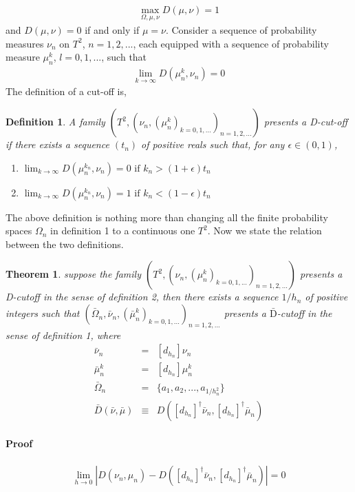 \documentclass{article}
\newtheorem{definition}{Definition}
\newtheorem{theorem}{Theorem}
\begin{document}
\begin{eqnarray}
\max_{\Omega,\mu,\nu} D(\mu,\nu) = 1
\end{eqnarray}
and $D(\mu,\nu)=0$ if and only if $\mu=\nu$. Consider a sequence of
probability measures $\nu_n$ on $T^2$, $n=1,2,...$, each
equipped with a sequence of probability measure $\mu^k_n$,
$l=0,1,...$, such that
\begin{eqnarray}
\lim_{k \rightarrow \infty} D(\mu^k_n,\nu_n)=0
\end{eqnarray}
The definition of a cut-off is,
\begin{definition}
\label{cutoffdefition}
A family $(T^2,(\nu_n, (\mu^k_n)_{k=0,1,...})_{n=1,2,...})$
presents a D-cut-off if there exists a sequence $(t_n)$ of positive
reals such that, for any $\epsilon \in(0,1)$,
\begin{enumerate}
  \item $\lim_{k \rightarrow \infty}D(\mu^{k_n}_n,\nu_n) = 0 \mbox{ if }
  k_n>(1+\epsilon)t_n$
  \item $\lim_{k \rightarrow \infty}D(\mu^{k_n}_n,\nu_n) = 1 \mbox{ if }
  k_n<(1-\epsilon)t_n $
\end{enumerate}
\end{definition}

The above definition is nothing more than changing all the finite probability spaces $\Omega_n$ in definition 1 to a continuous one $T^2$. Now we state the relation between the two definitions.

\begin{theorem}
suppose the family $(T^2,(\nu_n,(\mu_n^k)_{k=0,1,...})_{n=1,2,...})$ presents a D-cutoff in the sense of definition 2, then there exists a sequence $1/h_n$ of positive integers such that $(\bar{\Omega}_n,\bar{\nu}_n,(\bar{\mu}_n^k)_{k=0,1,...} )_{n=1,2,...}$ presents a $\bar{\text{D}}$-cutoff in the sense of definition 1, where 
\begin{eqnarray}
      \bar{\nu}_n &=& [d_{h_n}]\nu_n\\
      \bar{\mu}_n^k &=& [d_{h_n}]\mu_n^k\\
      \bar{\Omega}_n &=& \{ a_1,a_2,...,a_{1/{h_n^2}} \}\\
      \bar{D}(\bar{\nu},\bar{\mu})&\equiv& D([d_{h_n}]^\dagger\bar{\nu}_n,[d_{h_n}]^\dagger \bar{\mu}_n)  
\end{eqnarray}  
\end{theorem}

\paragraph{Proof}
 \begin{eqnarray}
  \lim_{h \rightarrow 0} | D(\nu_n,\mu_n) - D([d_{h_n}]^\dagger\bar{\nu}_n,[d_{h_n}]^\dagger \bar{\mu}_n)  |=0
 \end{eqnarray}
\end{document}
